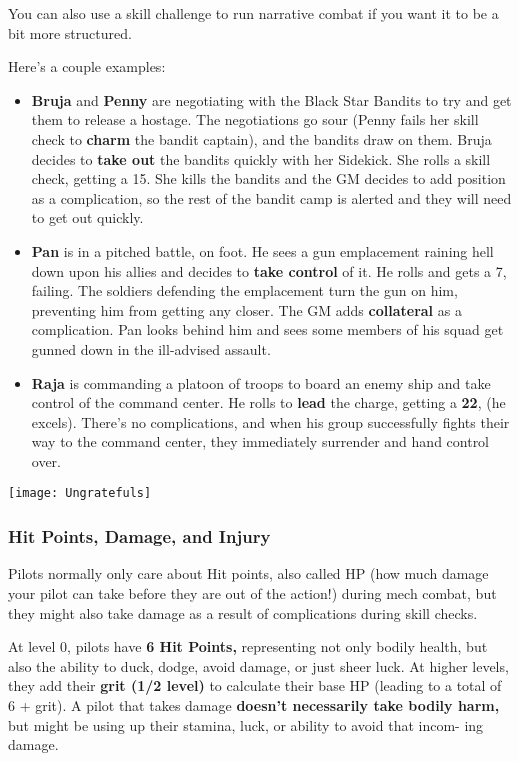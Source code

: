 You can also use a skill challenge to run narrative combat if you want it to be a bit more structured. 

Here's a couple examples:
\begin{itemize}
\item \textbf{Bruja} and \textbf{Penny} are negotiating with the Black Star Bandits to try and get them to release a hostage. The negotiations go sour (Penny fails her skill check to \textbf{charm} the bandit captain), and the bandits draw on them. Bruja decides to \textbf{take out} the bandits quickly with her Sidekick. She rolls a skill check, getting a 15. She kills the bandits and the GM decides to add position as a complication, so the rest of the bandit camp is alerted and they will need to get out quickly.
\item \textbf{Pan} is in a pitched battle, on foot. He sees a gun emplacement raining hell down upon his allies and decides to \textbf{take control} of it. He rolls and gets a 7, failing. The soldiers defending the emplacement turn the gun on him, preventing him from getting any closer. The GM adds \textbf{collateral} as a complication. Pan looks behind him and sees some members of his squad get gunned down in the ill-advised assault.
\item \textbf{Raja} is commanding a platoon of troops to board an enemy ship and take control of the command center. He rolls to \textbf{lead} the charge, getting a \textbf{22}, (he excels). There's no complications, and when his group successfully fights their way to the command center, they immediately surrender and hand control over.
\end{itemize}  

\newpage
\begin{center}
  \texttt{[image: Ungratefuls]}
\end{center}
\subsubsection{Hit Points, Damage, and Injury}

Pilots normally only care about Hit points, also called HP (how much damage your pilot can take before they are out of the action!) during mech combat, but they might also take damage as a result of complications during skill checks.

At level 0, pilots have \textbf{6 Hit Points,} representing not only bodily
health, but also the ability to duck, dodge, avoid damage, or just sheer luck.
At higher levels, they add their \textbf{grit (1/2 level)} to calculate their
base HP (leading to a total of 6 + grit). A pilot that takes damage
\textbf{doesn't necessarily take bodily harm,} but might be using up their
stamina, luck, or ability to avoid that incom- ing damage.

